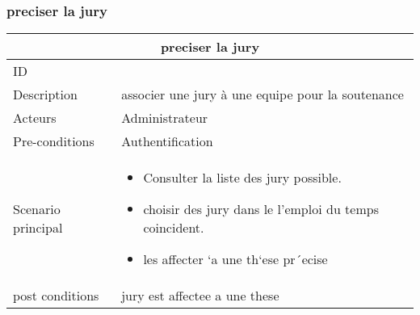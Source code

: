 \documentclass[11pt,fleqn]{book} %
\begin{document}
\subsubsection{preciser la jury}
\begin{center}
\begin{tabularx}{1\textwidth} { | p{4cm} | >{\raggedright\arraybackslash}X |  }
  \hline
  \multicolumn{2}{|c|}{preciser la jury} \\
 \hline
 ID & 3  \\
 \hline
 Description  & associer une jury à une equipe pour la soutenance   \\
  \hline
 Acteurs  & Administrateur   \\
  \hline
 Pre-conditions  & Authentification\\
 \hline
 Scenario principal  &  
 \begin{itemize}
     \item  Consulter la liste des jury possible.
     \item choisir des jury dans le l’emploi du temps coincident.
     \item les affecter `a une th`ese pr´ecise

 \end{itemize}\\
  \hline
 post conditions  & jury est affectee a une these \\
  \hline
\end{tabularx}
\label{tbl:nicetablelesstable}
\end{center}
\end{document}
